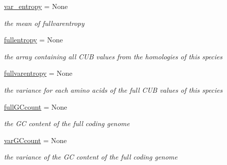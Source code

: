\begin{DoxyCompactItemize}
\mbox{\label{class_py_c_u_b_1_1espece_1_1_espece_ac7ce087a6722a531555c005c6b37ae88}} 
\mbox{\hyperlink{class_py_c_u_b_1_1espece_1_1_espece_ac7ce087a6722a531555c005c6b37ae88}{var\+\_\+entropy}} = None
\begin{DoxyCompactList}\small\item\em the mean of fullvarentropy \end{DoxyCompactList}\item 
\mbox{\label{class_py_c_u_b_1_1espece_1_1_espece_a27d1e4719b819c4e99e889904fbff5ed}} 
\mbox{\hyperlink{class_py_c_u_b_1_1espece_1_1_espece_a27d1e4719b819c4e99e889904fbff5ed}{fullentropy}} = None
\begin{DoxyCompactList}\small\item\em the array containing all C\+UB values from the homologies of this species \end{DoxyCompactList}\item 
\mbox{\label{class_py_c_u_b_1_1espece_1_1_espece_a7c21598e68d19819e523bb08af5a815d}} 
\mbox{\hyperlink{class_py_c_u_b_1_1espece_1_1_espece_a7c21598e68d19819e523bb08af5a815d}{fullvarentropy}} = None
\begin{DoxyCompactList}\small\item\em the variance for each amino acids of the full C\+UB values of this species \end{DoxyCompactList}\item 
\mbox{\label{class_py_c_u_b_1_1espece_1_1_espece_a4c199498e2938fdd8521fb724e9f4e58}} 
\mbox{\hyperlink{class_py_c_u_b_1_1espece_1_1_espece_a4c199498e2938fdd8521fb724e9f4e58}{full\+G\+Ccount}} = None
\begin{DoxyCompactList}\small\item\em the GC content of the full coding genome \end{DoxyCompactList}\item 
\mbox{\label{class_py_c_u_b_1_1espece_1_1_espece_a6f99cfcc3643e72bf48a2479c81b7e03}} 
\mbox{\hyperlink{class_py_c_u_b_1_1espece_1_1_espece_a6f99cfcc3643e72bf48a2479c81b7e03}{var\+G\+Ccount}} = None
\begin{DoxyCompactList}\small\item\em the variance of the GC content of the full coding genome \end{DoxyCompactList}\item 

\end{DoxyCompactItemize}
